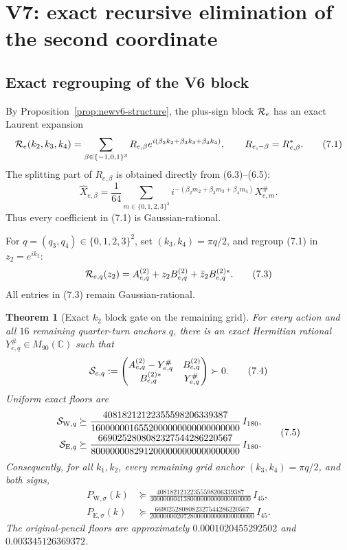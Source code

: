 \documentclass[11pt,oneside]{article}
\newtheorem{theorem}{Theorem}[section]
\theoremstyle{definition}
\theoremstyle{remark}
\begin{document}
\section{V7: exact recursive elimination of the second coordinate}
\label{sec:newv7-second}

\subsection{Exact regrouping of the V6 block}

By Proposition~\ref{prop:newv6-structure}, the plus-sign block
\({\cal R}_e\) has an exact Laurent expansion
\[
 {\cal R}_e(k_2,k_3,k_4)
 =\sum_{\beta\in\{-1,0,1\}^3}
 R_{e,\beta}e^{i(\beta_2k_2+\beta_3k_3+\beta_4k_4)},
 \qquad R_{e,-\beta}=R_{e,\beta}^*.                       \tag{7.1}
\]
The splitting part of \(R_{e,\beta}\) is obtained directly from
(6.3)--(6.5):
\[
 \widehat X_{e,\beta}
 =\frac1{64}\sum_{m\in\{0,1,2,3\}^3}
 i^{-(\beta_2m_2+\beta_3m_3+\beta_4m_4)}X_{e,m}^\#.
                                                               \tag{7.2}
\]
Thus every coefficient in (7.1) is Gaussian-rational.

For \(q=(q_3,q_4)\in\{0,1,2,3\}^2\), set
\((k_3,k_4)=\pi q/2\), and regroup (7.1) in \(z_2=e^{ik_2}\):
\[
 {\cal R}_{e,q}(z_2)
 =A_{e,q}^{(2)}+z_2B_{e,q}^{(2)}
  +\bar z_2B_{e,q}^{(2)*}.                                \tag{7.3}
\]
All entries in (7.3) remain Gaussian-rational.

\begin{theorem}[Exact \(k_2\) block gate on the remaining grid]
\label{thm:newv7-second}
For every action and all \(16\) remaining quarter-turn anchors
\(q\), there is an exact Hermitian rational
\(Y_{e,q}^\#\in M_{90}(\mathbb C)\) such that
\[
 {\cal S}_{e,q}:=
 \begin{pmatrix}
 A_{e,q}^{(2)}-Y_{e,q}^\#&B_{e,q}^{(2)}\\
 B_{e,q}^{(2)*}&Y_{e,q}^\#
 \end{pmatrix}\succ0.                                    \tag{7.4}
\]
Uniform exact floors are
\[
\begin{aligned}
 {\cal S}_{\mathrm W,q}
 &\succeq
 \frac{40818212122355598206339387}
 {1600000016552000000000000000000}\,I_{180},\\
 {\cal S}_{\mathrm E,q}
 &\succeq
 \frac{6690252808082327544286220567}
 {8000000082912000000000000000000}\,I_{180}.
\end{aligned}
\tag{7.5}
\]
Consequently, for all \(k_1,k_2\), every remaining grid anchor
\((k_3,k_4)=\pi q/2\), and both signs,
\[
\begin{aligned}
 P_{\mathrm W,\sigma}(k)
 &\succeq
 \frac{40818212122355598206339387}
 {400000004138000000000000000000}\,I_{45},\\
 P_{\mathrm E,\sigma}(k)
 &\succeq
 \frac{6690252808082327544286220567}
 {2000000020728000000000000000000}\,I_{45}.
\end{aligned}
\tag{7.6}
\]
The original-pencil floors are approximately
\(0.0001020455292502\) and \(0.003345126369372\).
\end{theorem}
\end{document}
